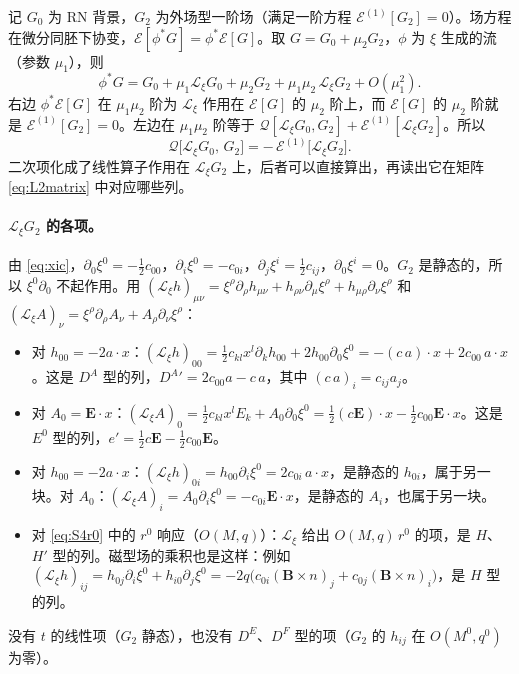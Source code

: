 \documentclass[11pt,a4paper]{ctexart}
\numberwithin{equation}{section}
\begin{document}
记 $G_0$ 为 RN 背景，$G_2$ 为外场型一阶场（满足一阶方程 $\mathcal E^{(1)}[G_2]=0$）。场方程在微分同胚下协变，$\mathcal E[\phi^*G]=\phi^*\mathcal E[G]$。取 $G=G_0+\mu_2G_2$，$\phi$ 为 $\xi$ 生成的流（参数 $\mu_1$），则
\begin{equation*}
\phi^*G=G_0+\mu_1\mathcal L_\xi G_0+\mu_2G_2+\mu_1\mu_2\,\mathcal L_\xi G_2+O(\mu_1^2).
\end{equation*}
右边 $\phi^*\mathcal E[G]$ 在 $\mu_1\mu_2$ 阶为 $\mathcal L_\xi$ 作用在 $\mathcal E[G]$ 的 $\mu_2$ 阶上，而 $\mathcal E[G]$ 的 $\mu_2$ 阶就是 $\mathcal E^{(1)}[G_2]=0$。左边在 $\mu_1\mu_2$ 阶等于 $\mathcal Q[\mathcal L_\xi G_0,G_2]+\mathcal E^{(1)}[\mathcal L_\xi G_2]$。所以
\begin{equation}
\mathcal Q\big[\mathcal L_\xi G_0,\,G_2\big]=-\,\mathcal E^{(1)}\big[\mathcal L_\xi G_2\big].
\label{eq:Qident}
\end{equation}
二次项化成了线性算子作用在 $\mathcal L_\xi G_2$ 上，后者可以直接算出，再读出它在矩阵 \eqref{eq:L2matrix} 中对应哪些列。

\paragraph{$\mathcal L_\xi G_2$ 的各项。}由 \eqref{eq:xic}，$\partial_0\xi^0=-\tfrac12c_{00}$，$\partial_i\xi^0=-c_{0i}$，$\partial_j\xi^i=\tfrac12c_{ij}$，$\partial_0\xi^i=0$。$G_2$ 是静态的，所以 $\xi^0\partial_0$ 不起作用。用 $(\mathcal L_\xi h)_{\mu\nu}=\xi^\rho\partial_\rho h_{\mu\nu}+h_{\rho\nu}\partial_\mu\xi^\rho+h_{\mu\rho}\partial_\nu\xi^\rho$ 和 $(\mathcal L_\xi A)_\nu=\xi^\rho\partial_\rho A_\nu+A_\rho\partial_\nu\xi^\rho$：
\begin{itemize}
\item 对 $h_{00}=-2a\cdot x$：$(\mathcal L_\xi h)_{00}=\tfrac12c_{kl}x^l\partial_kh_{00}+2h_{00}\partial_0\xi^0=-(c\,a)\cdot x+2c_{00}\,a\cdot x$。这是 $D^A$ 型的列，$D^A{}'=2c_{00}a-c\,a$，其中 $(c\,a)_i=c_{ij}a_j$。
\item 对 $A_0=\boldsymbol E\cdot x$：$(\mathcal L_\xi A)_0=\tfrac12c_{kl}x^lE_k+A_0\partial_0\xi^0=\tfrac12(c\boldsymbol E)\cdot x-\tfrac12c_{00}\boldsymbol E\cdot x$。这是 $E^0$ 型的列，$e'=\tfrac12c\boldsymbol E-\tfrac12c_{00}\boldsymbol E$。
\item 对 $h_{00}=-2a\cdot x$：$(\mathcal L_\xi h)_{0i}=h_{00}\partial_i\xi^0=2c_{0i}\,a\cdot x$，是静态的 $h_{0i}$，属于另一块。对 $A_0$：$(\mathcal L_\xi A)_i=A_0\partial_i\xi^0=-c_{0i}\boldsymbol E\cdot x$，是静态的 $A_i$，也属于另一块。
\item 对 \eqref{eq:S4r0} 中的 $r^0$ 响应（$O(M,q)$）：$\mathcal L_\xi$ 给出 $O(M,q)\,r^0$ 的项，是 $H$、$H'$ 型的列。磁型场的乘积也是这样：例如 $(\mathcal L_\xi h)_{ij}=h_{0j}\partial_i\xi^0+h_{i0}\partial_j\xi^0=-2q\big(c_{0i}(\boldsymbol B\times n)_j+c_{0j}(\boldsymbol B\times n)_i\big)$，是 $H$ 型的列。
\end{itemize}
没有 $t$ 的线性项（$G_2$ 静态），也没有 $D^E$、$D^F$ 型的项（$G_2$ 的 $h_{ij}$ 在 $O(M^0,q^0)$ 为零）。
\end{document}
